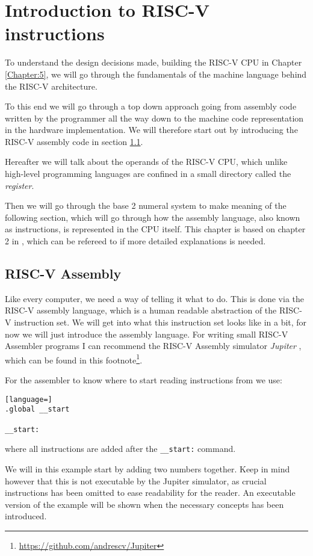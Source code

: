 \chapter{Introduction to RISC-V instructions}
    To understand the design decisions made, building the RISC-V CPU in Chapter \ref{Chapter:5}, we will go through the fundamentals of the machine language behind the RISC-V architecture. 
    
    To this end we will go through a top down approach going from assembly code written by the programmer all the way down to the machine code representation in the hardware implementation. We will therefore start out by introducing the RISC-V assembly code in section \ref{section:RISC-V Asembly}. 
    
    Hereafter we will talk about the operands of the RISC-V CPU, which unlike high-level programming languages are confined in a small directory called the \textit{register}. 
    
    Then we will go through the base 2 numeral system to make meaning of the following section, which will go through how the assembly language, also known as instructions, is represented in the CPU itself. This chapter is based on chapter 2 in \cite{riscVbook}, which can be refereed to if more detailed explanations is needed.

\section{RISC-V Assembly}\label{section:RISC-V Asembly}
    Like every computer, we need a way of telling it what to do. This is done via the RISC-V assembly language, which is a human readable abstraction of the RISC-V instruction set. We will get into what this instruction set looks like in a bit, for now we will just introduce the assembly language. For writing small RISC-V Assembler programs I can recommend the RISC-V Assembly simulator \textit{Jupiter} , which can be found in this footnote\footnote{\url{https://github.com/andrescv/Jupiter}}.
    
    For the assembler to know where to start reading instructions from we use:
    
    \begin{lstlisting}[language=]
.global __start

__start:
    \end{lstlisting}
    where all instructions are added after the \texttt{\_\_start:} command.
    
    We will in this example start by adding two numbers together. Keep in mind however that this is not executable by the Jupiter simulator, as crucial instructions has been omitted to ease readability for the reader. An executable version of the example will be shown when the necessary concepts has been introduced.
    
